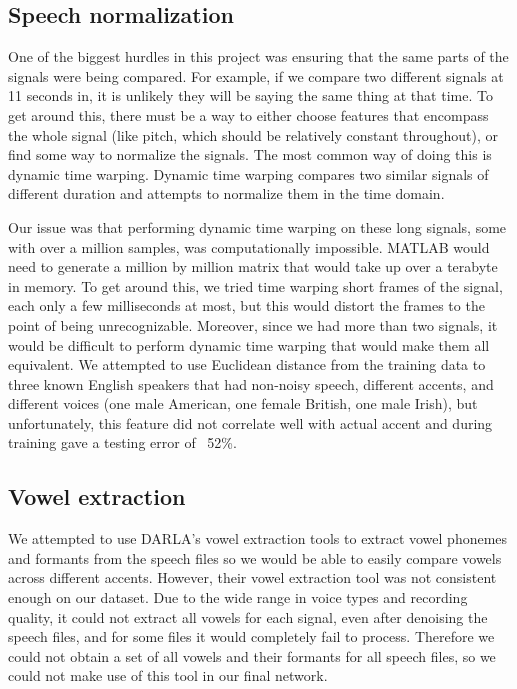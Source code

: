 \documentclass{article}
\begin{document}
\subsection{Speech normalization}
\label{subsec:normalization}

One of the biggest hurdles in this project was ensuring that the same parts of the signals were being compared.
For example, if we compare two different signals at 11 seconds in, it is unlikely they will be saying the same thing at that time.
To get around this, there must be a way to  either choose features that encompass the whole signal (like pitch, which should be relatively constant throughout), or find some way to normalize the signals.
The most common way of doing this is dynamic time warping.
Dynamic time warping compares two similar signals of different duration and attempts to normalize them in the time domain.

Our issue was that performing dynamic time warping on these long signals, some with over a million samples, was computationally impossible.
MATLAB would need to generate a million by million matrix that would take up over a terabyte in memory.
To get around this, we tried time warping short frames of the signal, each only a few milliseconds at most, but this would distort the frames to the point of being unrecognizable.
Moreover, since we had more than two signals, it would be difficult to perform dynamic time warping that would make them all equivalent.
We attempted to use Euclidean distance from the training data to three known English speakers that had non-noisy speech, different accents, and different voices (one male American, one female British, one male Irish), but unfortunately, this feature did not correlate well with actual accent and during training gave a testing error of ~52\%.

\subsection{Vowel extraction}
\label{subsec:vowel}

We attempted to use DARLA’s vowel extraction tools \cite{DARLA} to extract vowel phonemes and formants from the speech files so we would be able to easily compare vowels across different accents.
However, their vowel extraction tool was not consistent enough on our dataset.
Due to the wide range in voice types and recording quality, it could not extract all vowels for each signal, even after denoising the speech files, and for some files it would completely fail to process.
Therefore we could not obtain a set of all vowels and their formants for all speech files, so we could not make use of this tool in our final network.
\end{document}
